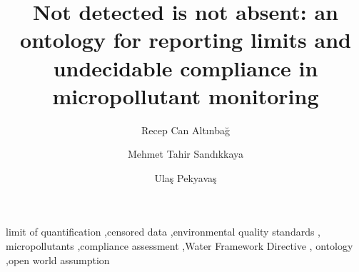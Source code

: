 \documentclass[preprint,review,12pt,authoryear]{elsarticle}
\begin{document}
\begin{frontmatter}

\title{Not detected is not absent: an ontology for reporting limits
and undecidable compliance in micropollutant monitoring}

\author[bu]{Recep Can Altınbağ}
\author[itu]{Mehmet Tahir Sandıkkaya}
\author[bu]{Ulaş Pekyavaş}
\address[bu]{Institute of Environmental Sciences, Boğaziçi University,
TR34342 Beşiktaş, Istanbul, Türkiye}
\address[itu]{Department of Computer Engineering, Istanbul Technical
University, TR34469 Sarıyer, Istanbul, Türkiye}

\begin{abstract}

\end{abstract}

\begin{keyword}
limit of quantification \sep censored data \sep environmental quality standards \sep
micropollutants \sep compliance assessment \sep Water Framework Directive \sep
ontology \sep open world assumption
\end{keyword}

\end{frontmatter}
\end{document}
